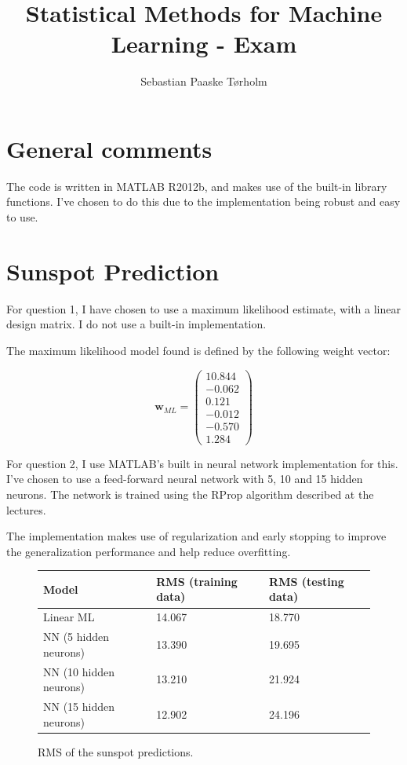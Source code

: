 \documentclass[11pt,a4paper]{article}
\title{Statistical Methods for Machine Learning - Exam}
\author{Sebastian Paaske Tørholm}
\begin{document}
\maketitle

\section{General comments}
The code is written in MATLAB R2012b, and makes use of the built-in library
functions. I've chosen to do this due to the implementation being robust
and easy to use.

\section{Sunspot Prediction}
For question 1, I have chosen to use a maximum likelihood estimate, with a
linear design matrix. I do not use a built-in implementation.

The maximum likelihood model found is defined by the following weight vector:

\[
    \mathbf{w}_{ML} = \begin{pmatrix} 10.844 \\ -0.062 \\ 0.121 \\ -0.012 \\ -0.570 \\ 1.284 \end{pmatrix}
\]


For question 2, I use MATLAB's built in neural network implementation for
this. I've chosen to use a feed-forward neural network with 5, 10 and 15
hidden neurons. The network is trained using the RProp algorithm described at
the lectures.

The implementation makes use of regularization and early stopping to improve
the generalization performance and help reduce overfitting.

\begin{figure}[h!]
    \centering
    \begin{tabular}{|l|l|l|}
        \hline
        Model & RMS (training data) & RMS (testing data) \\
        \hline
        Linear ML & 14.067 & 18.770 \\
        NN (5 hidden neurons) & 13.390 & 19.695 \\
        NN (10 hidden neurons) & 13.210 & 21.924 \\
        NN (15 hidden neurons) & 12.902 & 24.196 \\ 
        \hline
    \end{tabular}
    \caption{RMS of the sunspot predictions.}
    \label{sunspots-rms}
\end{figure}
\end{document}
